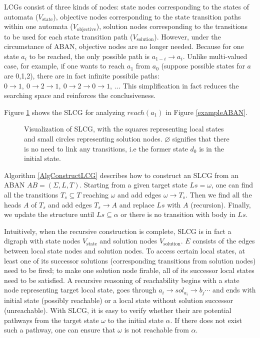 \begin{remark}
LCGs consist of three kinds of nodes: state nodes corresponding to the states of automata {\rm($V_{\mathrm{state}}$)}, objective nodes corresponding to the state transition paths within one automata {\rm($V_{\mathrm{objective}}$)}, solution nodes corresponding to the transitions to be used for each state transition path {\rm($V_{\mathrm{solution}}$)}.
However, under the circumstance of ABAN, objective nodes are no longer needed.
Because for one state $a_i$ to be reached, the only possible path is $a_{1-i}\to a_i$.
Unlike multi-valued case, for example, if one wants to reach $a_1$ from $a_0$ (suppose possible states for $a$ are 0,1,2), there are in fact infinite possibile paths: $0\to 1,\ 0\to 2 \to 1,\ 0 \to 2 \to 0 \to 1,\ \ldots$
This simplification in fact reduces the searching space and reinforces the conclusiveness.
\end{remark}

\begin{example}
    Figure \ref{LCGexample} shows the SLCG for analyzing $reach(a_1)$ in Figure \ref{exampleABAN}.
    \begin{figure}[ht]
        \centering
        
        \caption[SLCG]{Visualization of SLCG, with the squares representing local states and small circles representing solution nodes.
        $\varnothing$ signifies that there is no need to link any transitions, i.e the former state $d_0$ is in the initial state.}
        \label{LCGexample}
    \end{figure}
\end{example}

Algorithm \ref{AlgConstructLCG} describes how to construct an SLCG from an ABAN $AB = (\Sigma,L,T)$.
Starting from  a given target state $Ls=\omega$, one can find all the transitions $T_s\subseteq T$ reaching $\omega$ and add edges $\omega \to T_s$.
Then we find all the heads $A$ of $T_s$ and add edges $T_s \to A$ and replace $Ls$ with $A$ (recursion).
Finally, we update the structure until $Ls\subseteq \alpha$ or there is no transition with body in $Ls$.

Intuitively, when the recursive construction is complete, SLCG is in fact a digraph with state nodes $V_{\mathrm{state}}$ and solution nodes $V_{\mathrm{solution}}$. 
$E$ consists of the edges between local state nodes and solution nodes. 
To access certain local states, at least one of its successor solutions (corresponding transitions from solution nodes) need to be fired; to make one solution node firable, all of its successor local states need to be satisfied. 
A recursive reasoning of reachability begins with a state node representing target local state, goes through $a_i\to sol_{a_i}\to b_j \cdots$ and ends with initial state (possibly reachable) or a local state without solution successor (unreachable). 
With SLCG, it is easy to verify whether their are potential pathways from the target state $\omega$ to the initial state $\alpha$.
If there does not exist such a pathway, one can ensure that $\omega$ is not reachable from $\alpha$.

